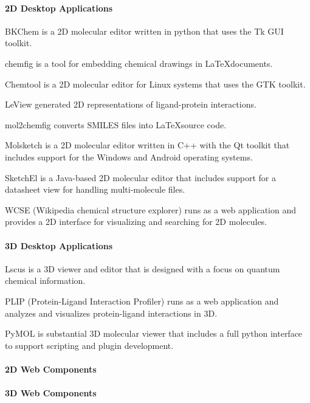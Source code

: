 \paragraph{2D Desktop Applications}

BKChem is a 2D molecular editor written in python that uses the Tk GUI toolkit.

chemfig is a tool for embedding chemical drawings in \LaTeX documents.

Chemtool is a 2D molecular editor for Linux systems that uses the GTK toolkit.

LeView \cite{Caboche_2013} generated 2D representations of ligand-protein interactions.

mol2chemfig \cite{Brefo_Mensah_2012} converts SMILES files into \LaTeX source code.

Molsketch is a 2D molecular editor written in C++ with the Qt toolkit that includes support for the Windows and Android operating systems.

SketchEl is a Java-based 2D molecular editor that includes support for a datasheet view for handling multi-molecule files.

WCSE (Wikipedia chemical structure explorer) \cite{Ertl_2015} runs as a web application and provides a 2D interface for visualizing and searching for 2D molecules.


\paragraph{3D Desktop Applications}

Lscus \cite{Kova_evi__2015} is a 3D viewer and editor that is designed with a focus on quantum chemical information.

PLIP (Protein-Ligand Interaction Profiler) \cite{Salentin_2015} runs as a web application and analyzes and visualizes protein-ligand interactions in 3D.

PyMOL is substantial 3D molecular viewer that includes a full python interface to support scripting and plugin development.

\paragraph{2D Web Components}

\paragraph{3D Web Components}